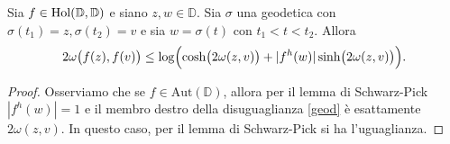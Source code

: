\begin{cor} \label{35}
  Sia $f \in \normalfont{\text{Hol}}(\mathbb{D},\mathbb{D})$ e siano $z, w \in \mathbb{D}$. Sia $\sigma$ una geodetica con $\sigma(t_1)=z, \sigma(t_2)=v$ e sia $w=\sigma(t)$ con $t_1<t<t_2$. Allora
  \begin{equation} \label{geod}
    2\omega\bigl(f(z),f(v)\bigr) \le \log\Bigl(\cosh\bigl(2\omega(z,v)\bigr)+|f^h(w)|\sinh\bigl(2\omega(z,v)\bigr)\Bigr).
  \end{equation}
\end{cor}
\begin{proof}
  Osserviamo che se $f \in \text{Aut}(\mathbb{D})$, allora per il lemma di Schwarz-Pick $|f^h(w)|=1$ e il membro destro della disuguaglianza \eqref{geod} è esattamente $2\omega(z,v)$. In questo caso, per il lemma di Schwarz-Pick si ha l'uguaglianza.


\end{proof}
